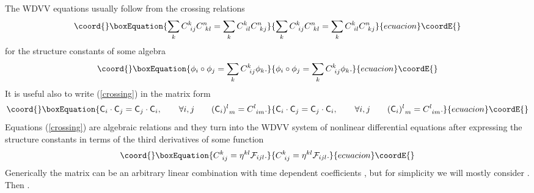 \documentclass[a4paper,]{article}
\def\F{{\cal F}}
\def\f{{\sf F}}
\def\C{{\sf C}}
\begin{document}
The WDVV equations usually follow from the crossing relations
\begin{equation}\coord{}\boxEquation{
\label{crossing}
\sum_k C^k_{\ ij}C^n_{\ kl} = \sum_k C^k_{\ il}C^n_{\ kj}
}{
\sum_k C^k_{\ ij}C^n_{\ kl} = \sum_k C^k_{\ il}C^n_{\ kj}
}{ecuacion}\coordE{}\end{equation}
for the structure constants of some algebra
\begin{equation}\coord{}\boxEquation{
\label{alg}
\phi_i\circ\phi_j =\sum_k  C^k_{\ ij}\phi_k.
}{
\phi_i\circ\phi_j =\sum_k  C^k_{\ ij}\phi_k.
}{ecuacion}\coordE{}\end{equation}
It is useful also to write (\ref{crossing}) in the matrix form
\begin{equation}\coord{}\boxEquation{
\label{crossmatr}
\C_i\cdot \C_j = \C_j\cdot \C_i,\qquad \forall i,j
\qquad  (\C_i)\sp{l}_{\ m} = C_{\ im}\sp{l}.
}{
\C_i\cdot \C_j = \C_j\cdot \C_i,\qquad \forall i,j
\qquad  (\C_i)\sp{l}_{\ m} = C_{\ im}\sp{l}.
}{ecuacion}\coordE{}\end{equation}
Equations (\ref{crossing}) are algebraic relations and they turn into the
WDVV system of nonlinear differential equations after expressing
the structure constants in terms of the third derivatives of some
function \myHighlight{$\F (a\sp1,\dots,a\sp{N})$}\coordHE{}
\begin{equation}\coord{}\boxEquation{
\label{cf}
C_{\ ij}^k = \eta^{kl}\F_{ijl}.
}{
C_{\ ij}^k = \eta^{kl}\F_{ijl}.
}{ecuacion}\coordE{}\end{equation}
Generically the matrix \myHighlight{$\eta$}\coordHE{} can be an arbitrary linear
combination with time dependent coefficients 
\myHighlight{$\eta = \sum_j \alpha\sp{j}({\bf a})\f_j$}\coordHE{},
but for simplicity we will mostly consider \myHighlight{$\eta=\f_1$}\coordHE{}.
Then \coordHE{}.
\end{document}
